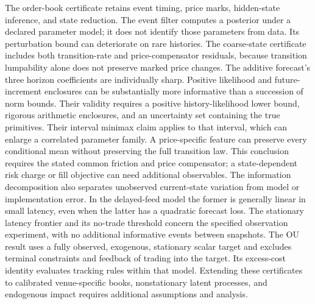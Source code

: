 \documentclass[11pt]{article}
\theoremstyle{plain}
\theoremstyle{definition}
\theoremstyle{remark}
\begin{document}
The order-book certificate retains event timing, price marks, hidden-state
inference, and state reduction. The event filter computes a posterior
under a declared parameter model; it does not identify those parameters
from data. Its perturbation bound can deteriorate on rare histories.
The coarse-state certificate includes both transition-rate and
price-compensator residuals, because transition lumpability alone
does not preserve marked price changes. The additive forecast's
three horizon coefficients are individually sharp. Positive
likelihood and future-increment enclosures can be substantially
more informative than a succession of norm bounds. Their validity
requires a positive history-likelihood lower bound, rigorous
arithmetic enclosures, and an uncertainty set containing the true
primitives. Their interval minimax claim applies to that interval,
which can enlarge a correlated parameter family.
A price-specific feature can preserve every conditional mean
without preserving the full transition law. This conclusion
requires the stated common friction and price compensator; a
state-dependent risk charge or fill objective can need additional
observables. The information decomposition also separates
unobserved current-state variation from model or implementation
error. In the delayed-feed model the former is generally linear
in small latency, even when the latter has a quadratic forecast
loss. The stationary latency frontier and its no-trade threshold
concern the specified observation experiment, with no additional
informative events between snapshots.
The OU result uses a fully observed, exogenous, stationary scalar target
and excludes terminal constraints and feedback of trading into the
target. Its excess-cost identity evaluates tracking rules within that
model. Extending these certificates to calibrated venue-specific books,
nonstationary latent processes, and endogenous impact requires
additional assumptions and analysis.
\end{document}
